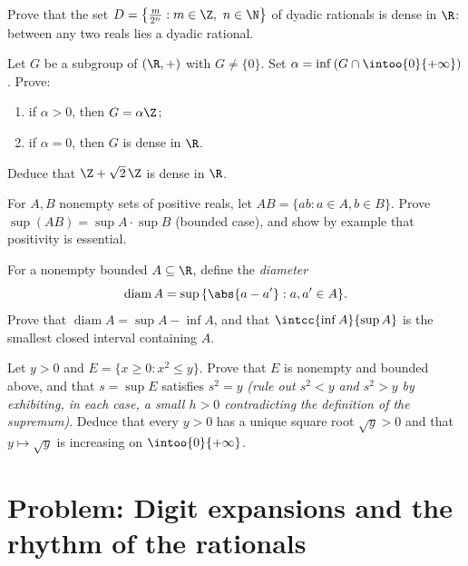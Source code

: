 \begin{exercise}[$\star\star$]\label{exo:b1:reals:8}
Prove that the set $D = \bigl\{\frac{m}{2^n} : m \in \Z,\ n \in
\N\bigr\}$ of dyadic rationals is dense in $\R$: between any two
reals lies a dyadic rational.
\end{exercise}

\begin{exercise}[$\star\star\star$]\label{exo:b1:reals:9}
Let $G$ be a subgroup of $(\R, +)$ with $G \neq \{0\}$. Set $\alpha =
\inf\,(G \cap \intoo{0}{+\infty})$. Prove:
\begin{enumerate}
  \item if $\alpha > 0$, then $G = \alpha\Z$;
  \item if $\alpha = 0$, then $G$ is dense in $\R$.
\end{enumerate}
Deduce that $\Z + \sqrt 2\,\Z$ is dense in $\R$.
\end{exercise}

\begin{exercise}[$\star\star\star$]\label{exo:b1:reals:10}
For $A, B$ nonempty sets of positive reals, let $AB = \{ab : a \in
A, b \in B\}$. Prove $\sup(AB) = \sup A \cdot \sup B$ (bounded case),
and show by example that positivity is essential.
\end{exercise}

\begin{exercise}[$\star\star$]\label{exo:b1:reals:11}
For a nonempty bounded $A \subseteq \R$, define the
\emph{diameter}
\[
\operatorname{diam} A = \sup\,\{\abs{a - a'} : a, a' \in A\} .
\]
Prove that $\operatorname{diam} A = \sup A - \inf A$, and that
$\intcc{\inf A}{\sup A}$ is the smallest closed interval
containing $A$.
\end{exercise}

\begin{exercise}[$\star\star\star$]\label{exo:b1:reals:12}
Let $y > 0$ and $E = \{x \geq 0 : x^2 \leq y\}$. Prove that $E$ is
nonempty and bounded above, and that $s = \sup E$ satisfies $s^2 =
y$ \emph{(rule out $s^2 < y$ and $s^2 > y$ by exhibiting, in each
case, a small $h > 0$ contradicting the definition of the
supremum)}. Deduce that every $y > 0$ has a unique square root
$\sqrt y > 0$ and that $y \mapsto \sqrt y$ is increasing on
$\intoo{0}{+\infty}$.
\end{exercise}

\section{Problem: Digit expansions and the rhythm of the rationals}

